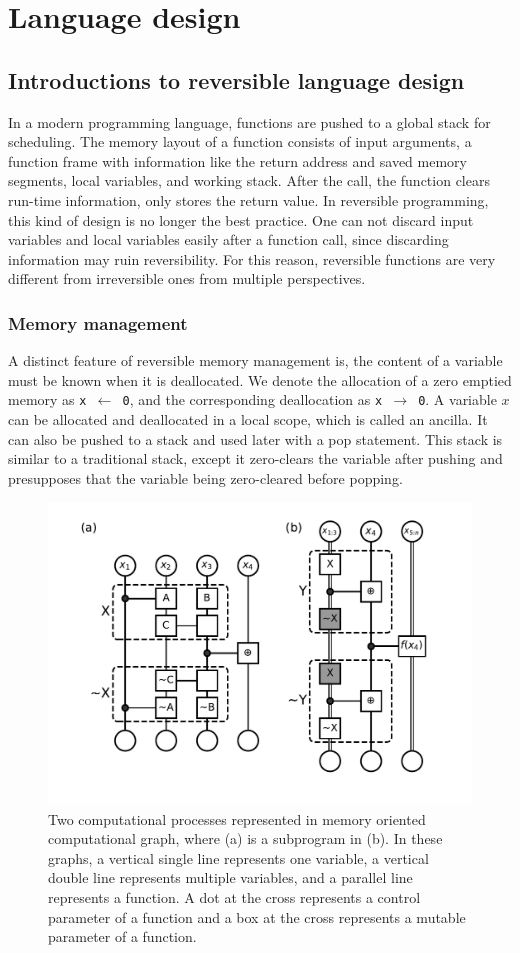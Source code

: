 \documentclass{article}
\newcommand{\<}{\langle}
\renewcommand{\>}{\rangle}
\theoremstyle{definition}\newtheorem{definition}{\textit{Definition}}
\begin{document}
\section{Language design}\label{sec:lang}

    \subsection{Introductions to reversible language design}
    In a modern programming language, functions are pushed to a global stack for scheduling. The memory layout of a function consists of input arguments, a function frame with information like the return address and saved memory segments, local variables, and working stack. After the call, the function clears run-time information, only stores the return value. In reversible programming, this kind of design is no longer the best practice. One can not discard input variables and local variables easily after a function call, since discarding information may ruin reversibility. For this reason, reversible functions are very different from irreversible ones from multiple perspectives.

\subsubsection{Memory management}
    A distinct feature of reversible memory management is, the content of a variable must be known when it is deallocated.
    We denote the allocation of a zero emptied memory as \texttt{x $\leftarrow$ 0}, and the corresponding deallocation as \texttt{x $\rightarrow$ 0}.
    A variable $x$ can be allocated and deallocated in a local scope, which is called an ancilla.
    It can also be pushed to a stack and used later with a pop statement.
    This stack is similar to a traditional stack, except it zero-clears the variable after pushing and presupposes that the variable being zero-cleared before popping.
\begin{figure}
    \centerline{\includegraphics[width=0.6\columnwidth,trim={0 1cm 0 0cm},clip]{fig6.pdf}}
    \caption{Two computational processes represented in memory oriented computational graph, where (a) is a subprogram in (b). In these graphs, a vertical single line represents one variable, a vertical double line represents multiple variables, and a parallel line represents a function. A dot at the cross represents a control parameter of a function and a box at the cross represents a mutable parameter of a function.
    }\label{fig:ccu}
\end{figure}
\end{document}
